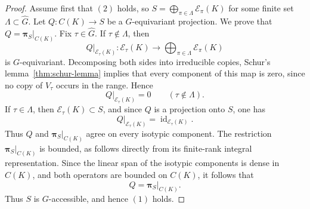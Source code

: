 \documentclass[11pt,showkeys]{amsart}
\begin{document}
\begin{proof}
Assume first that $(2)$ holds, so
\(
        S=
        \bigoplus_{\pi\in\Lambda}
        \mathcal E_\pi(K)
\)
for some finite set \(\Lambda\subset\widehat G\). Let
\(Q:C(K)\to S\) be a \(G\)-equivariant projection. We prove that
\(Q=\mathbf \pi_S|_{C(K)}\).
Fix \(\tau\in\widehat G\). If \(\tau\notin\Lambda\), then
\[
        Q|_{\mathcal E_\tau(K)}
        :
        \mathcal E_\tau(K)
        \longrightarrow
        \bigoplus_{\pi\in\Lambda}
        \mathcal E_\pi(K)
\]
is \(G\)-equivariant. Decomposing both sides into irreducible copies,
Schur's lemma~\ref{thm:schur-lemma} implies that every component of this
map is zero, since no copy of \(V_\tau\) occurs in the range. Hence
\[
        Q|_{\mathcal E_\tau(K)}=0
        \qquad(\tau\notin\Lambda).
\]
If \(\tau\in\Lambda\), then \(\mathcal E_\tau(K)\subset S\), and since
\(Q\) is a projection onto \(S\), one has
\[
        Q|_{\mathcal E_\tau(K)}
        =
        \operatorname{id}_{\mathcal E_\tau(K)}.
\]
Thus \(Q\) and \(\mathbf \pi_S|_{C(K)}\) agree on every isotypic component.
The restriction \(\mathbf \pi_S|_{C(K)}\) is bounded, as follows directly
from its finite-rank integral representation. Since the linear span of the
isotypic components is dense in \(C(K)\), and both operators are bounded
on \(C(K)\), it follows that
\[
        Q=\mathbf \pi_S|_{C(K)}.
\]
Thus \(S\) is \(G\)-accessible, and hence $(1)$ holds.


\end{proof}
\end{document}
